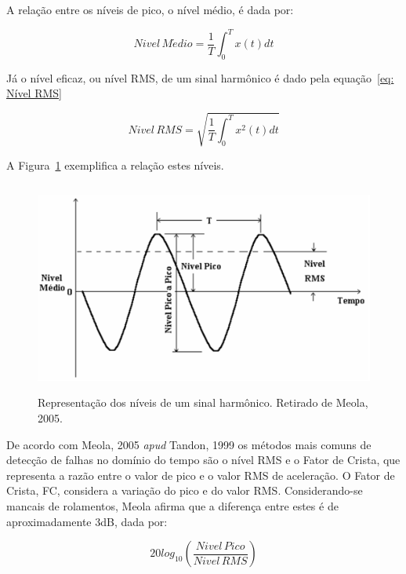 \documentclass[
	12pt,				
	oneside,			
	a4paper,			
	english,			
	brazil,			
	]{abntex2ppgsi}
\begin{document}
A relação entre os níveis de pico, o nível médio, é dada por:

\begin{equation}
	Nivel \, M\acute{e}dio = \frac{1}{T} \int_{0}^{T} x(t)dt
	\label{eq: Nível Médio}
\end{equation}


Já o nível eficaz, ou nível RMS, de um sinal harmônico é dado pela equação~\ref{eq: Nível RMS}

\begin{equation}
	Nivel \, RMS = \sqrt{ \frac{1}{T} \int_{0}^{T} x^{2}(t)dt }
	\label{eq: Nível RMS}
\end{equation}


A Figura~\ref{RelacaoSinalHarmonico} exemplifica a relação estes níveis.

\begin{figure}[!htb]
\centering
\includegraphics[width=\textwidth,height=70mm,keepaspectratio]{Figura17}
\caption {Representação dos níveis de um sinal harmônico. Retirado de Meola, 2005.}
\label{RelacaoSinalHarmonico}
\end{figure}

De acordo com Meola, 2005 \textit{apud} Tandon, 1999 os métodos mais comuns de detecção de falhas no domínio do tempo são o nível RMS e o Fator de Crista, que representa a razão entre o valor de pico e o valor RMS de aceleração. O Fator de Crista, FC, considera a variação do pico e do valor RMS. Considerando-se mancais de rolamentos, Meola afirma que a diferença entre estes é de aproximadamente 3dB, dada por:

\begin{equation}
	20log_{10} \left ( \frac{Nivel \,Pico}{Nivel \, RMS} \right )
	\label{eq: Nível de Pico vs RMS}
\end{equation}
\end{document}
